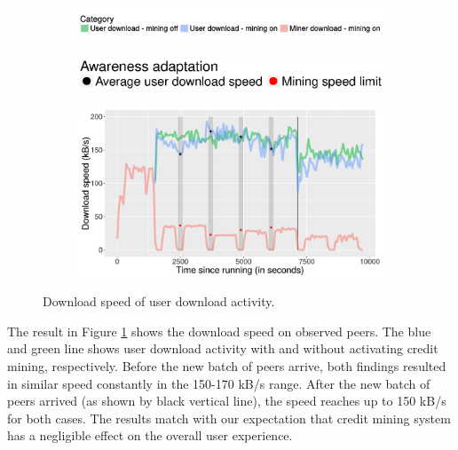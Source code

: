 \vspace{-0.4cm}
\begin{figure}[h!]
	
	\begin{subfigure}{\textwidth}
		\includegraphics[width=\textwidth]{pics/results/legends-prio.pdf}
	\end{subfigure}
	\begin{subfigure}{0.6\textwidth}
		\vspace{-0.65cm}
		\includegraphics[width=\textwidth]{pics/results/legends-prio2.eps}
	\end{subfigure}
	
	\begin{subfigure}{0.9\textwidth}
		\vspace{-0.2cm}
		\centering
		\includegraphics[width=\textwidth]{pics/results/pr_g2-act2_cpl2.pdf}
	\end{subfigure}
	\vspace{-0.2cm}
	\caption{Download speed of user download activity.}
	\label{fig:cmprio}
\end{figure}

The result in Figure \ref{fig:cmprio} shows the download speed on observed peers. The blue and green line shows user download activity with and without activating credit mining, respectively. Before the new batch of peers arrive, both findings resulted in similar speed constantly in the 150-170 kB/s range. After the new batch of peers arrived (as shown by black vertical line), the speed reaches up to 150 kB/s for both cases. The results match with our expectation that credit mining system has a negligible effect on the overall user experience. 


